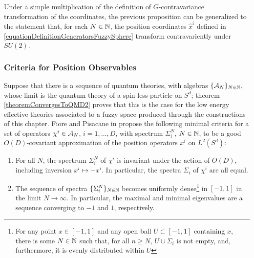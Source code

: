 Under a simple multiplication of the definition of $G$-contravariance transformation of the coordinates, the previous proposition can be generalized to the statement that, for each $N \in \mathbb{N}$, the position coordinates $\hat x^i$ defined in \eqref{equationDefinitionGeneratorsFuzzySphere} transform contravariently under $SU(2)$.

\lin

\subsubsection{Criteria for Position Observables}\label{subsectionCriteriaGOodApproximationsOfPosition}

Suppose that there is a sequence of quantum theories, with algebras $\{\mathcal A_N\}_{N \in \mathbb{N}}$, whose limit is the quantum theory of a spin-less particle on $S^d$; theorem \ref{theoremConvergesToQMD2} proves that this is the case for the low energy effective theories associated to a fuzzy space produced through the constructions of this chapter. Fiore and Pisacane in \cite{FioreXi2020} propose the following minimal criteria for a set of operators $\chi^i \in \mathcal A_N$, $i = 1, \dots, D$, with spectrum $\Sigma^N_i$, $N \in \mathbb{N}$, to be a good $O(D)$-covariant approximation of the position operators $x^i$ on $L^2(S^d)$:
    \begin{enumerate}
    
    \item For all $N$, the spectrum $\Sigma^N_i$ of $\chi^i$ is invariant under the action of $O(D)$, including inversion $x^i \mapsto -x^i$. In particular, the spectra $\Sigma_i$ of $\chi^i$ are all equal.
    
    \item The sequence of spectra $\{\Sigma_i^N\}_{N \in \mathbb{N}}$ becomes uniformly dense\footnote{For any point $x \in [-1, 1]$ and any open ball $U \subset [-1, 1]$ containing $x$, there is some $N \in \mathbb{N}$ such that, for all $n \geq N$, $U \cup \Sigma_i$ is not empty, and, furthermore, it is evenly distributed within $U$} in $[-1, 1]$ in the limit $N \to \infty$. In particular, the maximal and minimal eigenvalues are a sequence converging to $-1$ and $1$, respectively.
    
    \end{enumerate}

